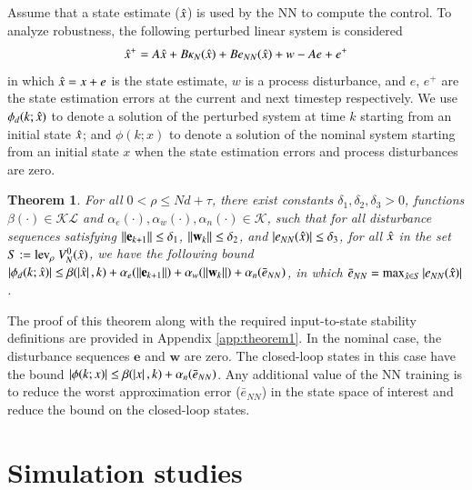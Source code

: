 \documentclass[preprint,5p, twocolumn, authoryear]{elsarticle}
\newtheorem{thm}{Theorem}
\begin{document}
Assume that a state estimate ($\hat{x}$) is
used by the NN to compute the control. 
To analyze robustness, the following perturbed
linear system is considered
\begin{align} \label{eq:perturbed_sys}
    \hat{x}^+ = A\hat{x} + B\kappa_N(\hat{x}) + Be_{NN}(\hat{x}) + w - Ae + e^+
\end{align}
in which $\hat{x} = x + e$ is the state estimate, 
$w$ is a process disturbance, 
and $e$, $e^+$ are the state estimation errors at the 
current and next timestep respectively. 
We use $\phi_d(k;\hat{x})$ to denote a solution of the perturbed system  at time
$k$ starting from an initial state $\hat{x}$; and $\phi(k;x)$ to denote a
solution  of the nominal system starting  from an initial state $x$ when the
state estimation errors and process disturbances are zero.

\begin{thm} \label{thm:nnrobustness}
For all $ 0 < \rho \leq Nd + \tau$, 
there exist constants $\delta_1, \delta_2, \delta_3 > 0$, 
functions $\beta(\cdot) \in \mathcal{K} \mathcal{L}$
and $\alpha_e(\cdot) , \alpha_w(\cdot), \alpha_{n}(\cdot) \in \mathcal{K}$,
such that for all disturbance sequences
satisfying $\left| \left| \mathbf{e}_{k+1} \right| \right| \leq \delta_1$,
$\left| \left| \mathbf{w}_k \right| \right| \leq \delta_2$,
and $\left| e_{NN}(\hat{x}) \right| \leq \delta_3$,
for all $\hat{x}$ in the set $S := \textnormal{lev}_{\rho} \ V_N^0(\xhat)$,
we have the following bound 
$\left| \phi_d(k; \hat{x}) \right| \leq \beta(\left| \hat{x} \right|, k) 
+ \alpha_e(\left| \left| \mathbf{e}_{k+1} \right| \right|) + 
\alpha_w(\left| \left| \mathbf{w}_k \right| \right|) + 
\alpha_n(\bar{e}_{NN})$, 
in which 
$\bar{e}_{NN} = \textnormal{max}_{\hat{x} \in S} \left| e_{NN}(\hat{x}) \right|$.
\end{thm}

The proof of this theorem along with the required 
input-to-state stability definitions are provided 
in Appendix \ref{app:theorem1}.
In the nominal case, 
the disturbance sequences $\mathbf{e}$ and $\mathbf{w}$ are zero.
The closed-loop states in this case have the bound
$\left| \phi(k; x) \right| \leq \beta(\left| x \right|, k) + 
\alpha_n(\bar{e}_{NN})$. Any additional value of 
the NN training is to reduce the worst 
approximation error ($\bar{e}_{NN}$) 
in the state space of interest and 
reduce the bound on the closed-loop states. 

\section{Simulation studies} \label{sec:simulation_studies}
\end{document}
